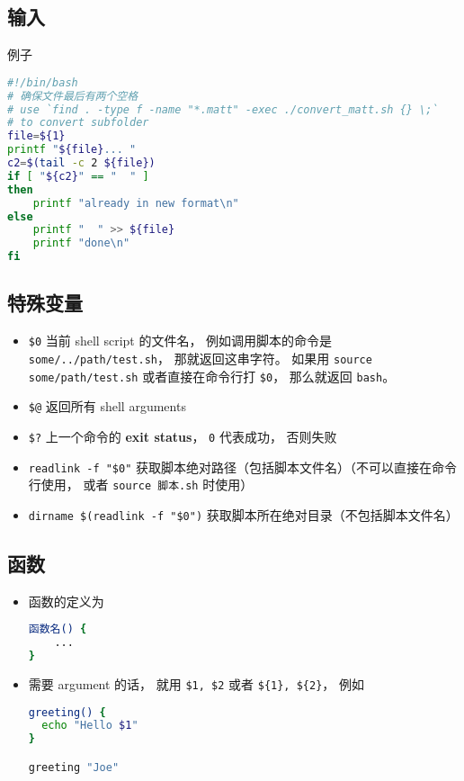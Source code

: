 \subsection{输入}
例子
\begin{lstlisting}[language=bash]
#!/bin/bash
# 确保文件最后有两个空格
# use `find . -type f -name "*.matt" -exec ./convert_matt.sh {} \;`
# to convert subfolder
file=${1}
printf "${file}... "
c2=$(tail -c 2 ${file})
if [ "${c2}" == "  " ]
then
	printf "already in new format\n"
else
	printf "  " >> ${file}
	printf "done\n"
fi
\end{lstlisting}

\subsection{特殊变量}
\begin{itemize}
\item \verb`$0` 当前 shell script 的文件名， 例如调用脚本的命令是 \verb`some/../path/test.sh`， 那就返回这串字符。 如果用 \verb`source some/path/test.sh` 或者直接在命令行打 \verb`$0`， 那么就返回 \verb`bash`。
\item \verb`$@` 返回所有 shell arguments
\item \verb`$?` 上一个命令的 \textbf{exit status}， \verb`0` 代表成功， 否则失败
\item \verb`readlink -f "$0"` 获取脚本绝对路径（包括脚本文件名）（不可以直接在命令行使用， 或者 \verb`source 脚本.sh` 时使用）
\item \verb`dirname $(readlink -f "$0")` 获取脚本所在绝对目录（不包括脚本文件名）
\end{itemize}

\subsection{函数}

\begin{itemize}
\item 函数的定义为
\begin{lstlisting}[language=bash]
函数名() {
	...
}
\end{lstlisting}
\item 需要 argument 的话， 就用 \verb`$1, $2` 或者 \verb`${1}, ${2}`， 例如
\begin{lstlisting}[language=bash]
greeting() {
  echo "Hello $1"
}

greeting "Joe"
\end{lstlisting}
\end{itemize}


